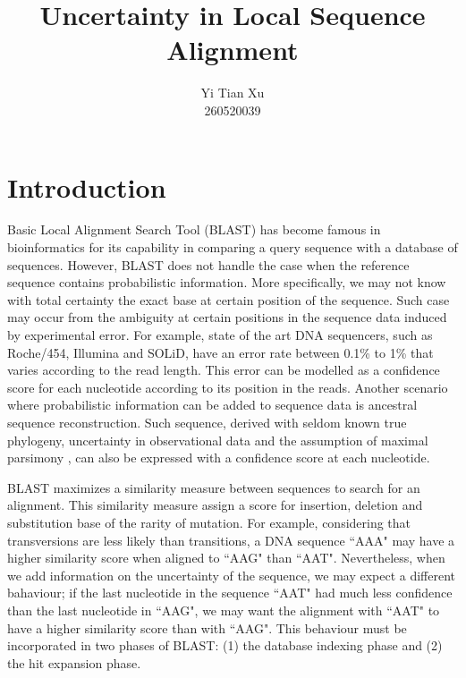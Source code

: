 \documentclass{article}
\begin{document}
\title{Uncertainty in Local Sequence Alignment}
\author{Yi Tian Xu\\260520039}

\maketitle

\abstract{}


\section{Introduction}

Basic Local Alignment Search Tool (BLAST) has become famous in bioinformatics for its capability in comparing a query sequence with a database of sequences. However, BLAST does not handle the case when the reference sequence contains probabilistic information. More specifically, we may not know with total certainty the exact base at certain position of the sequence. Such case may occur from the ambiguity at certain positions in the sequence data induced by experimental error. For example, state of the art DNA sequencers, such as Roche/454, Illumina and SOLiD, have an error rate between 0.1\% to 1\% that varies according to the read length. \cite{sequencers} This error can be modelled as a confidence score for each nucleotide according to its position in the reads. Another scenario where probabilistic information can be added to sequence data is ancestral sequence reconstruction. Such sequence, derived with seldom known true phylogeny, uncertainty in observational data and the assumption of maximal parsimony \cite{parsimony}, can also be expressed with a confidence score at each nucleotide. 

BLAST maximizes a similarity measure between sequences to search for an alignment. This similarity measure assign a score for insertion, deletion and substitution base of the rarity of mutation. \cite{blast} For example, considering that transversions are less likely than transitions, a DNA sequence ``AAA" may have a higher similarity score when aligned to ``AAG" than ``AAT". Nevertheless, when we add information on the uncertainty of the sequence, we may expect a different bahaviour; if the last nucleotide in the sequence ``AAT" had much less confidence than the last nucleotide in ``AAG", we may want the alignment with ``AAT" to have a higher similarity score than with ``AAG". This behaviour must be incorporated in two phases of BLAST: (1) the database indexing phase and (2) the hit expansion phase.  
\end{document}
